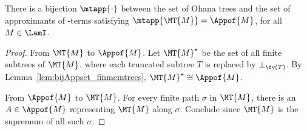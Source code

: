 \setcounter{thm:MTbijApp}{\thetheorem}
\begin{theorem}\label{thm:MTbijApp} 
	There is a bijection $\mtapp{\cdot}$ between the set of Ohana trees and the set of approximants of \lamI-terms satisfying $\mtapp{\MT{M}} = \Appof{M}$, for all $M\in\LamI$.

\end{theorem}

\begin{proof} From $\MT{M}$ to $\Appof{M}$.
Let $\MT{M}^\star$ be the set of all finite subtrees of $\MT{M}$, 
where each truncated subtree $T$ is replaced by $\bot_{\fv(T)}$.
By Lemma~\ref{lem:bijAppset_finmemtrees}, $\MT{M}^\star\cong\Appof{M}$.

From $\Appof{M}$ to $\MT{M}$. For every finite path $\sigma$ in $\MT{M}$, there is an $A\in\Appof{M}$ representing $\MT{M}$ along $\sigma$. Conclude since $\MT{M}$ is the supremum of all such $\sigma$.
\end{proof}


